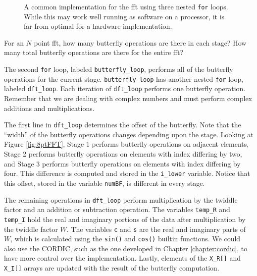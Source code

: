\begin{figure}

\caption{ A common implementation for the \gls{fft} using three nested \lstinline|for| loops.  While this may work well running as software on a processor, it is far from optimal for a hardware implementation.}
\label{fig:fft_sw}
\end{figure}

\begin{exercise}
For an $N$ point \gls{fft}, how many butterfly operations are there in each stage? How many total butterfly operations are there for the entire \gls{fft}?
\end{exercise}

The second \lstinline|for| loop, labeled \lstinline|butterfly_loop|, performs all of the butterfly operations for the current stage. \lstinline|butterfly_loop| has another nested \lstinline|for| loop, labeled \lstinline|dft_loop|. Each iteration of \lstinline|dft_loop| performs one butterfly operation. Remember that we are dealing with complex numbers and must perform complex additions and multiplications. 

The first line in \lstinline|dft_loop| determines the offset of the butterfly. Note that the ``width'' of the butterfly operations changes depending upon the stage. Looking at Figure \ref{fig:8ptFFT}, Stage 1 performs butterfly operations on adjacent elements, Stage 2 performs butterfly operations on elements with index differing by two, and Stage 3 performs butterfly operations on elements with index differing by four. This difference is computed and stored in the \lstinline|i_lower| variable. Notice that this offset, stored in the variable \lstinline|numBF|, is different in every stage. 

The remaining operations in \lstinline|dft_loop| perform multiplication by the twiddle factor and an addition or subtraction operation. The variables \lstinline|temp_R| and \lstinline|temp_I| hold the real and imaginary portions of the data after multiplication by the twiddle factor $W$. The variables \lstinline|c| and \lstinline|s| are the real and imaginary parts of $W$, which is calculated using the \lstinline|sin()| and \lstinline|cos()| builtin functions. We could also use the CORDIC, such as the one developed in Chapter \ref{chapter:cordic}, to have more control over the implementation. Lastly, elements of the \lstinline|X_R[]| and \lstinline|X_I[]| arrays are updated with the result of the butterfly computation.

